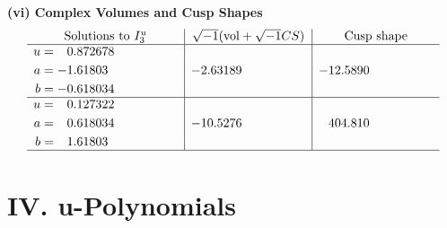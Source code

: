 \documentclass[1p]{elsarticle_modified}
\theoremstyle{definition}
\newcommand{\I}{\sqrt{-1}}
\begin{document}
\newpage\flushleft \textbf{(vi) Complex Volumes and Cusp Shapes}
$$\begin{array}{c|c|c}  
\text{Solutions to }I^u_{3}& \I (\text{vol} + \sqrt{-1}CS) & \text{Cusp shape}\\
 \hline 
\begin{aligned}
u &= \phantom{-}0.872678\phantom{ +0.000000I} \\
a &= -1.61803\phantom{ +0.000000I} \\
b &= -0.618034\phantom{ +0.000000I}\end{aligned}
 & -2.63189\phantom{ +0.000000I} & -12.5890\phantom{ +0.000000I} \\ \hline\begin{aligned}
u &= \phantom{-}0.127322\phantom{ +0.000000I} \\
a &= \phantom{-}0.618034\phantom{ +0.000000I} \\
b &= \phantom{-}1.61803\phantom{ +0.000000I}\end{aligned}
 & -10.5276\phantom{ +0.000000I} & \phantom{-}404.810\phantom{ +0.000000I}\\
 \hline 
 \end{array}$$\newpage
\newpage\renewcommand{\arraystretch}{1}
\centering \section*{ IV. u-Polynomials}
\end{document}
